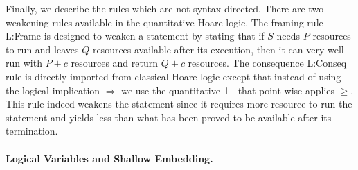 \documentclass[nocopyrightspace,preprint]{sigplanconf}
\begin{document}
Finally, we describe the rules which are not syntax directed.  There
are two weakening rules available in the quantitative Hoare logic.
The framing rule {\sc L:Frame} is designed to weaken a statement by
stating that if $S$ needs $P$ resources to run and leaves $Q$
resources available after its execution, then it can very well run
with $P + c$ resources and return $Q + c$ resources.  The consequence
{\sc L:Conseq} rule is directly imported from classical Hoare logic
except that instead of using the logical implication $\Rightarrow$ we
use the quantitative $\models$ that point-wise applies $\ge$.  This
rule indeed weakens the statement since it requires more resource to
run the statement and yields less than what has been proved to be
available after its termination.


\paragraph{Logical Variables and Shallow Embedding.}
\end{document}
